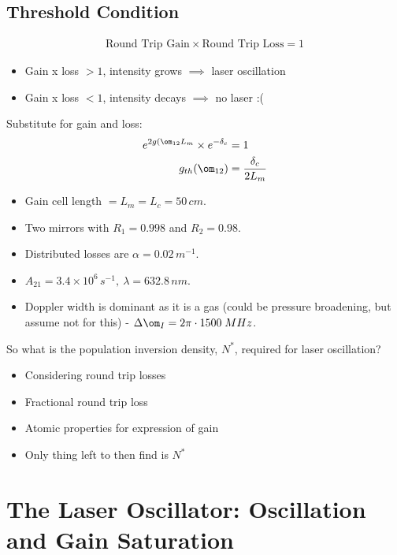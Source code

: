 \documentclass[a4paper, 11pt, normalem]{report}
\begin{document}
\section{Threshold Condition}
\begin{align}
    \text{Round Trip Gain}\times\text{Round Trip Loss} = 1
\end{align}
\begin{itemize}
    \item Gain x loss $>1$, intensity grows $\implies$ laser oscillation 
    \item Gain x loss $<1$, intensity decays $\implies$ no laser :(
\end{itemize}
Substitute for gain and loss:
\begin{align}
    e^{2g(\om_{12}L_m}\times e^{-\delta_c} &= 1 \\
    g_{th}(\om_{12}) &= \frac{\delta_c}{2L_m}
\end{align}

\begin{example}
    \begin{itemize}
        \item Gain cell length $= L_m = L_c = 50\,cm$.
        \item Two mirrors with $R_1 = 0.998$ and $R_2 = 0.98$.
        \item Distributed losses are $\alpha = 0.02\,m^{-1}$.
        \item $A_{21} = 3.4\times10^6\,s^{-1},~ \lambda = 632.8\,nm$.
        \item Doppler width is dominant as it is a gas (could be pressure broadening, but assume not for this) - $\Delta\om_I = 2\pi\cdot1500\;MHz$.
    \end{itemize}
    So what is the population inversion density, $N^*$, required for laser oscillation?
    \begin{itemize}
        \item Considering round trip losses
        \item Fractional round trip loss
        \item Atomic properties for expression of gain
        \item Only thing left to then find is $N^*$
    \end{itemize}
\end{example}

\chapter{The Laser Oscillator: Oscillation and Gain Saturation}
\end{document}
